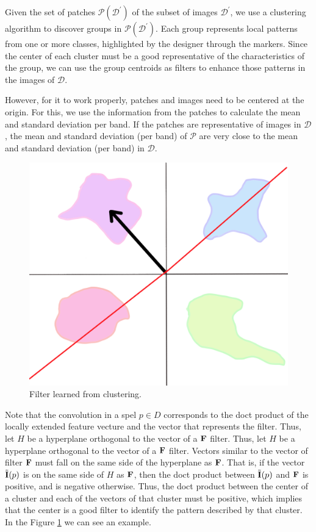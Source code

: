 \documentclass[a4paper,conference]{IEEEtran}
\newcommand{\D}{\mathcal{D}}
\newcommand{\m}[1]{{\mathrm{\bf #1}}}
\newcommand{\E}{\tilde{\m{I}}}
\newcommand{\mF}{\m{F}}
\newcommand{\Pa}{\mathcal{P}}
\newcommand{\pDD}{\D^\prime}
\begin{document}
Given the set of patches $\Pa(\pDD)$ of the subset of images $\pDD$, we use a clustering algorithm to discover groups in $\Pa(\pDD)$. Each group represents local patterns from one or more classes, highlighted by the designer through the markers. Since the center of each cluster must be a good representative of the characteristics of the group, we can use the group centroids as filters to enhance those patterns in the images of $\D$.

However, for it to work properly, patches and images need to be centered at the origin. For this, we use the information from the patches to calculate the mean and standard deviation per band. If the patches are representative of images in $\D$, the mean and standard deviation (per band) of $\Pa$ are very close to the mean and standard deviation (per band) in $\D$.

\begin{figure}[t]
  \begin{center}
     \includegraphics[width=0.8\linewidth]{figures/filter.png}
  \end{center}
     \caption{Filter learned from clustering.}
  \label{fig:filter}
\end{figure}

Note that the convolution in a spel $p \in D$ corresponds to the doct product of the locally extended feature vecture and the vector that represents the filter. Thus, let $H$ be a hyperplane orthogonal to the vector of a $\mF$ filter. Thus, let $ H $ be a hyperplane orthogonal to the vector of a $ \mF$ filter. Vectors similar to the vector of filter $\mF$ must fall on the same side of the hyperplane as $\mF$. That is, if the vector $\E(p)$ is on the same side of $H$ as $\mF$, then the doct product between $\E (p)$ and $\mF$ is positive, and is negative otherwise. Thus, the doct product between the center of a cluster and each of the vectors of that cluster must be positive, which implies that the center is a good filter to identify the pattern described by that cluster. In the Figure \ref{fig:filter} we can see an example.
\end{document}
